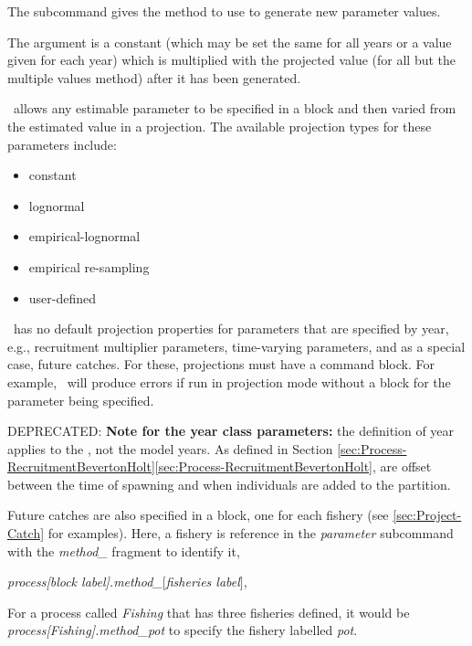 The  subcommand gives the method to use to generate new parameter values.

The argument  is a constant (which may be set the same for all years or a value given for each year) which is multiplied with the projected value (for all but the multiple values method) after it has been generated. 

\CNAME\ allows any estimable parameter to be specified in a  block and then varied from the estimated value in a projection. The available projection types for these parameters include:

\begin{itemize}
	\item constant
	\item lognormal
	\item empirical-lognormal
	\item empirical re-sampling
	\item user-defined
\end{itemize}

\CNAME\ has no default projection properties for parameters that are specified by year, e.g., recruitment multiplier parameters, time-varying parameters, and as a special case, future catches. For these, projections  must have a  command block. For example, \CNAME\ will produce errors if run in projection mode without a  block for the  parameter being specified.

DEPRECATED: \textbf{Note for the year class parameters:} the definition of year applies to the , not the model years. As defined in Section \ifAgeBased \ref{sec:Process-RecruitmentBevertonHolt}\else \ref{sec:Process-RecruitmentBevertonHolt}\fi,  are offset between the time of spawning and when individuals are added to the partition.

Future catches are also specified in a  block, one for each fishery (see \ref{sec:Project-Catch} for examples). Here, a fishery is reference in the \textit{parameter} subcommand with the \textit{method\_} fragment to identify it,

 \textit{process[block label].method\_$[$fisheries label$]$},

For a process called \textit{Fishing} that has three fisheries defined, it would be \textit{process[Fishing].method\_pot} to specify the fishery labelled \textit{pot}.

